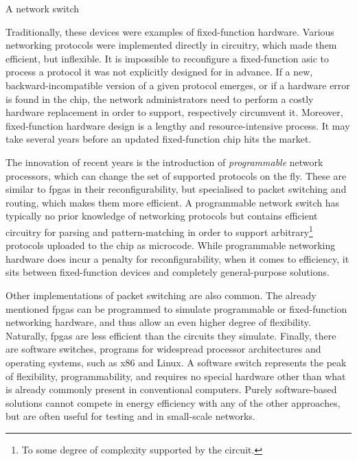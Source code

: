 A network switch

Traditionally, these devices were examples of fixed-function hardware. Various
networking protocols were implemented directly in circuitry, which made them
efficient, but inflexible. It is impossible to reconfigure a fixed-function
\acrshort{asic} to process a protocol it was not explicitly designed for in
advance. If a new, backward-incompatible version of a given protocol emerges, or
if a hardware error is found in the chip, the network administrators need to
perform a costly hardware replacement in order to support, respectively
circumvent it. Moreover, fixed-function hardware design is a lengthy and
resource-intensive process. It may take several years before an updated
fixed-function chip hits the market.

The innovation of recent years is the introduction of \emph{programmable}
network processors, which can change the set of supported protocols on the fly.
These are similar to \acrshort{fpga}s in their reconfigurability, but
specialised to packet switching and routing, which makes them more efficient. A
programmable network switch has typically no prior knowledge of networking
protocols but contains efficient circuitry for parsing and pattern-matching in
order to support arbitrary\footnote{To some degree of complexity supported by
the circuit.} protocols uploaded to the chip as microcode. While programmable
networking hardware does incur a penalty for reconfigurability, when it comes to
efficiency, it sits between fixed-function devices and completely general-purpose
solutions.

Other implementations of packet switching are also common. The already mentioned
\acrlong{fpga}s can be programmed to simulate programmable or fixed-function
networking hardware, and thus allow an even higher degree of flexibility.
Naturally, \acrshort{fpga}s are less efficient than the circuits they simulate.
Finally, there are software switches, programs for widespread processor
architectures and operating systems, such as x86 and Linux. A software switch
represents the peak of flexibility, programmability, and requires no special
hardware other than what is already commonly present in conventional computers.
Purely software-based solutions cannot compete in energy efficiency with any of
the other approaches, but are often useful for testing and in small-scale
networks.

